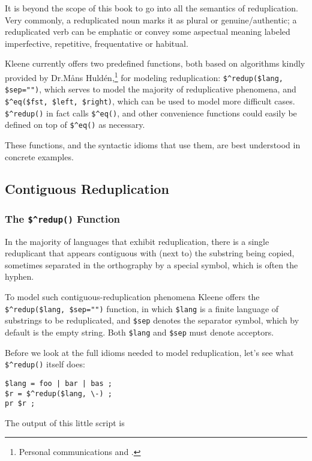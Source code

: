 It is beyond the scope of this book to go into all the semantics of reduplication.  Very commonly, a
reduplicated noun marks it as plural or genuine/authentic; a reduplicated verb can be emphatic or convey
some aspectual meaning labeled imperfective, repetitive, frequentative or habitual.

Kleene currently 
offers two predefined functions, 
both based on algorithms kindly 
provided by Dr.\@ M\r{a}ns Huldén,\footnote{Personal communications and 
\citet{Hulden:2009:SFC:1564035.1564059}.} for modeling reduplication:  \verb!$^redup($lang, $sep="")!, which
serves to model the majority of reduplicative phenomena, and \verb!$^eq($fst, $left, $right)!, which
can be used to model more difficult cases.  \verb!$^redup()! in fact
calls \verb!$^eq()!, and other convenience functions could easily be defined on top of \verb!$^eq()!
as necessary.

These functions, and the syntactic idioms that use them, are best understood in concrete examples.


\subsection{Contiguous Reduplication}

\cprotect\subsubsection{The \verb!$^redup()! Function}

In the majority of languages that exhibit reduplication, there is a single
reduplicant that appears contiguous with (next to) the substring being
copied, sometimes 
separated in the orthography by a special symbol, which is often the hyphen.

To model such contiguous-reduplication phenomena Kleene offers the \verb!$^redup($lang, $sep="")! function,
in which \verb!$lang! is a finite language of substrings to be reduplicated, and \verb!$sep!
denotes the separator symbol, which by default is the empty string.  Both \verb!$lang! and \verb!$sep! must
denote acceptors.

Before we look at the full idioms needed to model reduplication, let's see
what \verb!$^redup()! itself does:

\begin{Verbatim}
$lang = foo | bar | bas ;
$r = $^redup($lang, \-) ;
pr $r ;
\end{Verbatim}

\noindent
The output of this little script is


